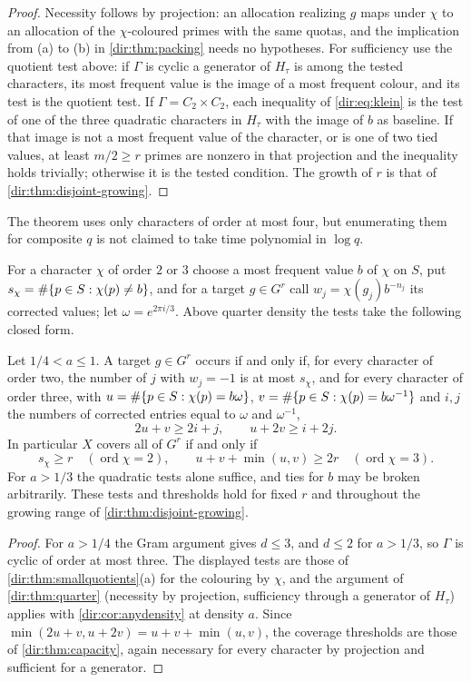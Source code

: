 \begin{proof}
Necessity follows by projection: an allocation realizing $g$ maps under $\chi$ to an allocation of the
$\chi$-coloured primes with the same quotas, and the implication from (a) to (b) in \cref{dir:thm:packing}
needs no hypotheses. For sufficiency use the quotient test above: if $\Gamma$ is cyclic a generator of $H_\tau$ is among the tested
characters, its most frequent value is the image of a most frequent colour, and its test is the quotient
test. If $\Gamma=C_2\times C_2$, each inequality of \eqref{dir:eq:klein} is the test of one of the three
quadratic characters in $H_\tau$ with the image of $b$ as baseline. If that image is not a most frequent
value of the character, or is one of two tied values, at least $m/2\ge r$ primes are nonzero in that
projection and the inequality holds trivially; otherwise it is the tested condition. The growth of $r$ is
that of \cref{dir:thm:disjoint-growing}.
\end{proof}

The theorem uses only characters of order at most four, but enumerating them for composite $q$ is not
claimed to take time polynomial in $\log q$.

For a character $\chi$ of order $2$ or $3$ choose a most frequent value $b$ of $\chi$ on $S$, put
$s_\chi=\#\{p\in S:\chi(p)\ne b\}$, and for a target $g\in G^r$ call $w_j=\chi(g_j)b^{-n_j}$ its
corrected values; let $\omega=e^{2\pi i/3}$. Above quarter density the tests take the following closed form.

\begin{corollary}\label{dir:thm:disjoint-support}
Let $1/4<a\le1$. A target $g\in G^r$ occurs if and only if, for every character of order
two, the number of $j$ with $w_j=-1$ is at most $s_\chi$, and for every character of order three,
with $u=\#\{p\in S:\chi(p)=b\omega\}$, $v=\#\{p\in S:\chi(p)=b\omega^{-1}\}$ and $i,j$ the numbers of
corrected entries equal to $\omega$ and $\omega^{-1}$,
\[
 2u+v\ge2i+j,\qquad u+2v\ge i+2j .
\]
In particular $X$ covers all of $G^r$ if and only if
\[
 s_\chi\ge r\quad(\operatorname{ord}\chi=2),\qquad u+v+\min(u,v)\ge2r\quad(\operatorname{ord}\chi=3).
\]
For $a>1/3$ the quadratic tests alone suffice, and ties for $b$ may be broken arbitrarily. These
tests and thresholds hold for fixed $r$ and throughout the growing range of \cref{dir:thm:disjoint-growing}.
\end{corollary}

\begin{proof}
For $a>1/4$ the Gram argument gives $d\le3$, and $d\le2$ for $a>1/3$, so $\Gamma$ is cyclic of order at most
three. The displayed tests are those of \cref{dir:thm:smallquotients}(a) for the colouring by $\chi$, and the
argument of \cref{dir:thm:quarter} (necessity by projection, sufficiency through a generator of $H_\tau$)
applies with \cref{dir:cor:anydensity} at density $a$. Since $\min(2u+v,u+2v)=u+v+\min(u,v)$, the coverage
thresholds are those of \cref{dir:thm:capacity}, again necessary for every character by projection and
sufficient for a generator.
\end{proof}

